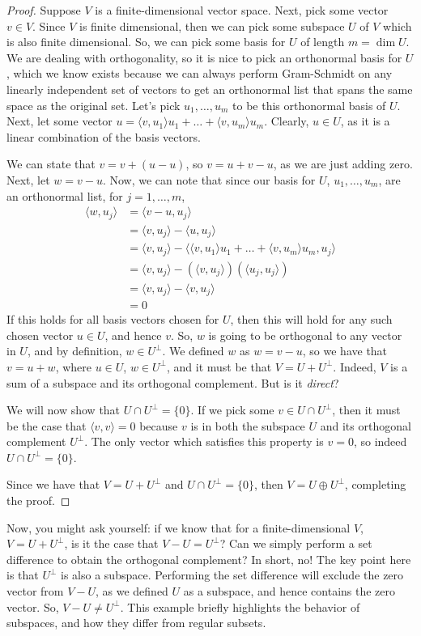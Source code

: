 \documentclass{article}
\newcommand{\la}{\langle}
\newcommand{\ra}{\rangle}
\theoremstyle{definition}
\begin{document}
\begin{proof}
    Suppose $V$ is a finite-dimensional vector space. Next, pick some vector $v \in V$. Since $V$ is finite dimensional, then we can pick some subspace $U$ of $V$ which is also finite dimensional. So, we can pick some basis for $U$ of length $m = \dim U$. We are dealing with orthogonality, so it is nice to pick an orthonormal basis for $U$, which we know exists because we can always perform Gram-Schmidt on any linearly independent set of vectors to get an orthonormal list that spans the same space as the original set. Let's pick $u_1, \dots, u_m$ to be this orthonormal basis of $U$. Next, let some vector $u = \la v, u_1 \ra u_1 + \dots + \la v, u_m \ra u_m$. Clearly, $u \in U$, as it is a linear combination of the basis vectors.

    We can state that $v = v + (u - u)$, so $v = u + v - u$, as we are just adding zero. Next, let $w = v - u$. Now, we can note that since our basis for $U$, $u_1, \dots, u_m$, are an orthonormal list, for $j = 1, \dots, m$,
    \begin{align*}
        \la w, u_j \ra &= \la v - u, u_j \ra \\
        &= \la v, u_j \ra - \la u, u_j \ra \\
        &= \la v, u_j \ra - \la \la v, u_1 \ra u_1 + \dots + \la v, u_m \ra u_m, u_j \ra \\
        &= \la v, u_j \ra - (\la v, u_j \ra)(\la u_j, u_j \ra) \\
        &= \la v, u_j \ra - \la v, u_j \ra \\
        & = 0
    \end{align*}
    If this holds for all basis vectors chosen for $U$, then this will hold for any such chosen vector $u \in U$, and hence $v$. So, $w$ is going to be orthogonal to any vector in $U$, and by definition, $w \in U^\perp$. We defined $w$ as $w = v - u$, so we have that $v = u + w$, where $u \in U$, $w \in U^\perp$, and it must be that $V = U + U^\perp$. Indeed, $V$ is a sum of a subspace and its orthogonal complement. But is it \textit{direct}?

    We will now show that $U \cap U^\perp = \{0\}$. If we pick some $v \in U \cap U^\perp$, then it must be the case that $\la v, v \ra = 0$ because $v$ is in both the subspace $U$ and its orthogonal complement $U^\perp$. The only vector which satisfies this property is $v = 0$, so indeed $U \cap U^\perp = \{0\}$.

    Since we have that $V = U + U^\perp$ and $U \cap U^\perp = \{0\}$, then $V = U \oplus U^\perp$, completing the proof.
\end{proof}
    Now, you might ask yourself: if we know that for a finite-dimensional $V$, $V = U + U^\perp$, is it the case that $V - U = U^\perp$? Can we simply perform a set difference to obtain the orthogonal complement? In short, no! The key point here is that $U^\perp$ is also a subspace. Performing the set difference will exclude the zero vector from $V - U$, as we defined $U$ as a subspace, and hence contains the zero vector. So, $V - U \neq U^\perp$. This example briefly highlights the behavior of subspaces, and how they differ from regular subsets.
\end{document}
